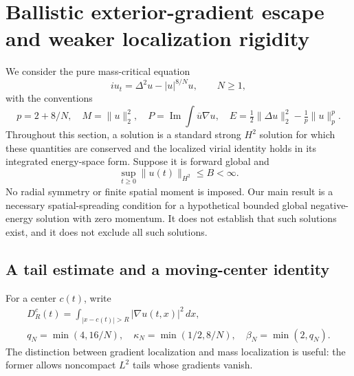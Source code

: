 \section{Ballistic exterior-gradient escape and weaker localization rigidity}
\label{sec:r10-dynamics}

We consider the pure mass-critical equation
\begin{equation}\label{eq:r10dyn-equation}
 iu_t=\Delta^2u-|u|^{8/N}u,\qquad N\ge1,
\end{equation}
with the conventions
\[
 p=2+8/N,\quad M=\|u\|_2^2,\quad
 P=\operatorname{Im}\int\overline u\nabla u,\quad
 E=\tfrac12\|\Delta u\|_2^2-\tfrac1p\|u\|_p^p.
\]
Throughout this section, a solution is a standard strong $H^2$ solution
for which these quantities are conserved and the localized virial identity
holds in its integrated energy-space form. Suppose it is forward global and
\begin{equation}\label{eq:r10dyn-bound}
 \sup_{t\ge0}\|u(t)\|_{H^2}\le B<\infty.
\end{equation}
No radial symmetry or finite spatial moment is imposed. Our main result is a
necessary spatial-spreading condition for a hypothetical bounded global
negative-energy solution with zero momentum. It does not establish that
such solutions exist, and it does not exclude all such solutions.

\subsection{A tail estimate and a moving-center identity}

For a center $c(t)$, write
\[
 \begin{gathered}
 D_R^c(t)=\int_{|x-c(t)|>R}|\nabla u(t,x)|^2\,dx,\\
 q_N=\min(4,16/N),\quad
 \kappa_N=\min(1/2,8/N),\quad \beta_N=\min(2,q_N).
 \end{gathered}
\]
The distinction between gradient localization and mass localization is
useful: the former allows noncompact $L^2$ tails whose gradients vanish.

